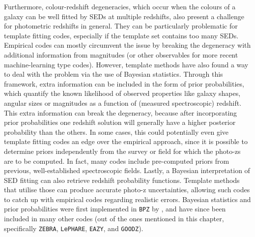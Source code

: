 Furthermore, colour-redshift degeneracies, which occur when the colours of a galaxy can be well fitted by SEDs at multiple redshifts, also present a challenge for photometric redshifts in general. They can be particularly problematic for template fitting codes, especially if the template set contains too many SEDs. Empirical codes can mostly circumvent the issue by breaking the degeneracy with additional information from magnitudes (or other observables for more recent machine-learning type codes). However, template methods have also found a way to deal with the problem via the use of Bayesian statistics. Through this framework, extra information can be included in the form of prior probabilities, which quantify the known likelihood of observed properties like galaxy shapes, angular sizes or magnitudes as a function of (measured spectroscopic) redshift. This extra information can break the degeneracy, because after incorporating prior probabilities one redshift solution will generally have a higher posterior probability than the others. In some cases, this could potentially even give template fitting codes an edge over the empirical approach, since it is possible to determine priors independently from the survey or field for which the photo-zs are to be computed.  In fact, many codes include pre-computed priors from previous, well-established spectroscopic fields. Lastly, a Bayesian interpretation of SED fitting can also retrieve redshift probability functions. Template methods that utilise those can produce accurate photo-z uncertainties, allowing such codes to catch up with empirical codes regarding realistic errors. Bayesian statistics and prior probabilities were first implemented in \texttt{BPZ} by \cite{2000A&A...363..476B}, and have since been included in many other codes (out of the ones mentioned in this chapter, specifically  \texttt{ZEBRA},  \texttt{LePHARE}, \texttt{EAZY}, and \texttt{GOODZ}). \par

